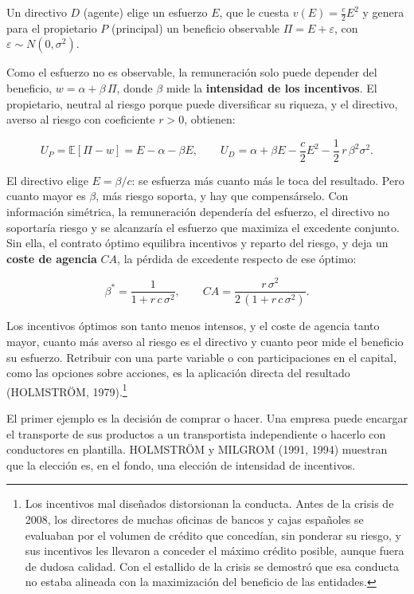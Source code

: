 \documentclass[10pt,a4paper]{article}
\begin{document}
Un directivo $D$ (agente) elige un esfuerzo $E$, que le cuesta $v(E)=\tfrac{c}{2}E^2$ y genera para el propietario $P$ (principal) un beneficio observable $\Pi=E+\varepsilon$, con $\varepsilon\sim N(0,\sigma^2)$. 

Como el esfuerzo no es observable, la remuneración solo puede depender del beneficio, $w=\alpha+\beta\,\Pi$, donde $\beta$ mide la \textbf{intensidad de los incentivos}. El propietario, neutral al riesgo porque puede diversificar su riqueza, y el directivo, averso al riesgo con coeficiente $r>0$, obtienen:

$$U_P=\mathbb{E}[\Pi-w]=E-\alpha-\beta E,\qquad U_D=\alpha+\beta E-\frac{c}{2}E^2-\frac{1}{2}\,r\,\beta^2\sigma^2.$$

El directivo elige $E=\beta/c$: se esfuerza más cuanto más le toca del resultado. Pero cuanto mayor es $\beta$, más riesgo soporta, y hay que compensárselo. Con información simétrica, la remuneración dependería del esfuerzo, el directivo no soportaría riesgo y se alcanzaría el esfuerzo que maximiza el excedente conjunto. Sin ella, el contrato óptimo equilibra incentivos y reparto del riesgo, y deja un \textbf{coste de agencia} $CA$, la pérdida de excedente respecto de ese óptimo:

$$\beta^{*}=\frac{1}{1+r\,c\,\sigma^{2}},\qquad CA=\frac{r\,\sigma^{2}}{2\,(1+r\,c\,\sigma^{2})}.$$

Los incentivos óptimos son tanto menos intensos, y el coste de agencia tanto mayor, cuanto más averso al riesgo es el directivo y cuanto peor mide el beneficio su esfuerzo. Retribuir con una parte variable o con participaciones en el capital, como las opciones sobre acciones, es la aplicación directa del resultado (HOLMSTRÖM, 1979).\footnote{%
  Los incentivos mal diseñados distorsionan la conducta. Antes de la crisis de 2008, los directores de muchas oficinas de bancos y cajas españoles se evaluaban por el volumen de crédito que concedían, sin ponderar su riesgo, y sus incentivos les llevaron a conceder el máximo crédito posible, aunque fuera de dudosa calidad. Con el estallido de la crisis se demostró que esa conducta no estaba alineada con la maximización del beneficio de las entidades.
}

El primer ejemplo es la decisión de comprar o hacer. Una empresa puede encargar el transporte de sus productos a un transportista independiente o hacerlo con conductores en plantilla. HOLMSTRÖM y MILGROM (1991, 1994) muestran que la elección es, en el fondo, una elección de intensidad de incentivos. 
\end{document}
